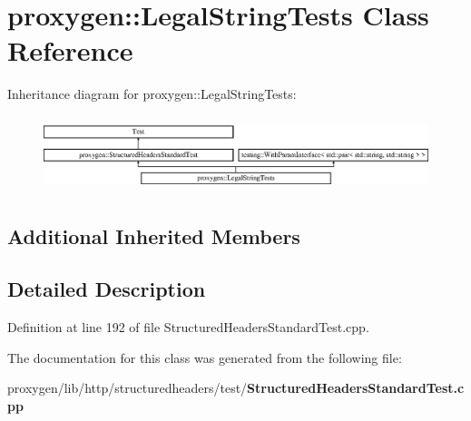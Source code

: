 \section{proxygen\+:\+:Legal\+String\+Tests Class Reference}
\label{classproxygen_1_1LegalStringTests}
Inheritance diagram for proxygen\+:\+:Legal\+String\+Tests\+:\begin{figure}[H]
\begin{center}
\leavevmode
\includegraphics[height=2.216359cm]{classproxygen_1_1LegalStringTests}
\end{center}
\end{figure}
\subsection*{Additional Inherited Members}


\subsection{Detailed Description}


Definition at line 192 of file Structured\+Headers\+Standard\+Test.\+cpp.



The documentation for this class was generated from the following file\+:\begin{DoxyCompactItemize}
\item 
proxygen/lib/http/structuredheaders/test/{\bf Structured\+Headers\+Standard\+Test.\+cpp}\end{DoxyCompactItemize}
